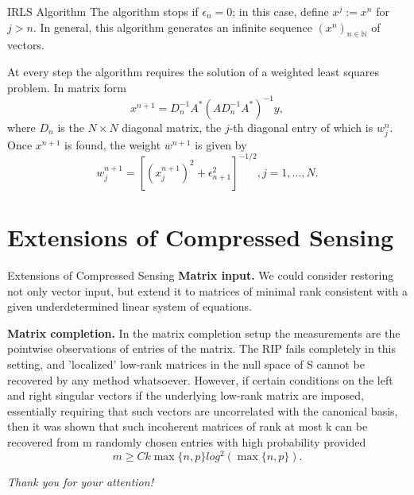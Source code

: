 \documentclass[
  english,            %
  aspectratio=169,    %
]{tumbeamer}
\begin{document}
\begin{frame}{IRLS Algorithm}
The algorithm stops if $\epsilon_n = 0$; in this case, define $x^j := x^n$ for $j > n$. In general, this algorithm generates an infinite sequence $(x^n)_{n \in \mathbb{N}}$ of vectors.

\bigskip At every step the algorithm requires the solution of a weighted least squares problem. In matrix form
\[ x^{n+1} = D_n^{-1} A^* (A D_n^{-1} A^*)^{-1} y,\]
where $D_n$ is the $N \times N$ diagonal matrix, the $j$-th diagonal entry of which is $w_j^n$. Once $x^{n+1}$ is found, the weight $w^{n+1}$ is given by
\[ w_j^{n+1} = [(x_j^{n+1})^2 + \epsilon_{n+1}^2]^{-1/2}, j = 1,...,N.\]
\end{frame}

\section{Extensions of Compressed Sensing}

\begin{frame}{Extensions of Compressed Sensing}
\textbf{Matrix input.} We could consider restoring not only vector input, but extend it to matrices of minimal rank consistent with a given underdetermined linear system of equations.


\bigskip \textbf{Matrix completion.} In the matrix completion setup the measurements are the pointwise observations of entries of the matrix. The RIP fails completely in this setting, and 'localized' low-rank matrices in the null space of S cannot be recovered by any method whatsoever. However, if certain conditions on the left and right singular vectors if the underlying low-rank matrix are imposed, essentially requiring that such vectors are uncorrelated with the canonical basis, then it was shown that such incoherent matrices of rank at most k can be recovered from m randomly chosen entries with high probability provided
\[ m \geq C k \max\{n,p\} log^2 (\max\{n,p\}) .\]
\end{frame}

\begin{frame}[c]{}
    \centering \Large
    \emph{Thank you for your attention!}
\end{frame}
\end{document}
